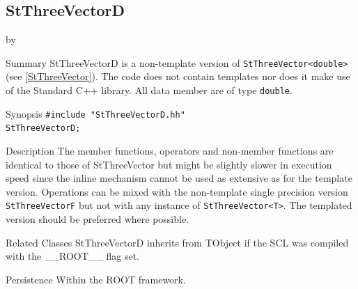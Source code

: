 \documentclass[twoside]{article}
\newcommand{\name}[1]{\textsf{#1}}%
\newcommand{\entrylabel}[1]{\mbox{\textbf{{#1}}}\hfil}%
\newenvironment{entry}
{\begin{list}{}%
    {\renewcommand{\makelabel}{\entrylabel}%
     \setlength{\labelwidth}{90pt}%
     \setlength{\leftmargin}{\labelwidth}
     \advance\leftmargin by \labelsep%
      }%
    }%
  {\end{list}}
\newcommand{\Entrylabel}[1]%
{\raisebox{0pt}[1ex][0pt]{\makebox[\labelwidth][l]%
    {\parbox[t]{\labelwidth}{\hspace{0pt}\textbf{{#1}}}}}}
\newenvironment{Entry}%
{\renewcommand{\entrylabel}{\Entrylabel}\begin{entry}}%
  {\end{entry}}
\begin{document}
\subsection{StThreeVectorD }
\begin{Entry}
\item[Summary]
    StThreeVectorD is a non-template version of \verb+StThreeVector<double>+
    (see \ref{StThreeVector}). The code does not contain templates nor
    does it make use of the Standard C++ library. All data member are of
    type \texttt{double}.
    
\item[Synopsis]
    \verb+#include "StThreeVectorD.hh"+ \\
    \verb+StThreeVectorD;+
    
    
\item[Description]       
    The member functions, operators and non-member functions are identical
    to those of StThreeVector but might be slightly slower in execution speed
    since the inline mechanism cannot be used as extensive as for the template
    version. Operations can be mixed with the non-template single precision version
    \texttt{StThreeVectorF} but not with any instance of \verb+StThreeVector<T>+.
    The templated version should be preferred where possible.
    
\item[Related Classes]
    StThreeVectorD inherits from TObject 
    if the SCL was compiled with the \name{\_\_ROOT\_\_} flag set.

\item[Persistence]
    Within the ROOT framework.

\end{Entry}

%
%
\end{document}
